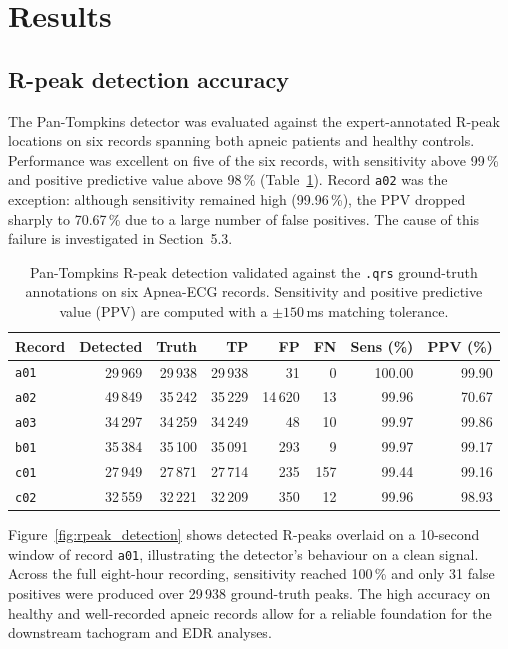 \documentclass[11pt,a4paper]{article}
\begin{document}
\section{Results}

\subsection{R-peak detection accuracy}

The Pan-Tompkins detector was evaluated against the expert-annotated R-peak locations on six records spanning both apneic patients and healthy controls. Performance was excellent on five of the six records, with sensitivity above 99\,\% and positive predictive value above 98\,\% (Table~\ref{tab:rpeak_validation}). Record \texttt{a02} was the exception: although sensitivity remained high (99.96\,\%), the PPV dropped sharply to 70.67\,\% due to a large number of false positives. The cause of this failure is investigated in Section~5.3.

\begin{table}[ht]
    \centering
    \caption{Pan-Tompkins R-peak detection validated against the \texttt{.qrs} ground-truth annotations on six Apnea-ECG records. Sensitivity and positive predictive value (PPV) are computed with a $\pm 150$\,ms matching tolerance.}
    \label{tab:rpeak_validation}
    \begin{tabular}{lrrrrrrr}
        \toprule
        Record & Detected & Truth & TP & FP & FN & Sens (\%) & PPV (\%) \\
        \midrule
        \texttt{a01} & 29\,969 & 29\,938 & 29\,938 &     31 &   0  & 100.00 & 99.90 \\
        \texttt{a02} & 49\,849 & 35\,242 & 35\,229 & 14\,620 &  13 &  99.96 & 70.67 \\
        \texttt{a03} & 34\,297 & 34\,259 & 34\,249 &     48 &  10 &  99.97 & 99.86 \\
        \texttt{b01} & 35\,384 & 35\,100 & 35\,091 &    293 &   9 &  99.97 & 99.17 \\
        \texttt{c01} & 27\,949 & 27\,871 & 27\,714 &    235 & 157 &  99.44 & 99.16 \\
        \texttt{c02} & 32\,559 & 32\,221 & 32\,209 &    350 &  12 &  99.96 & 98.93 \\
        \bottomrule
    \end{tabular}
\end{table}

Figure~\ref{fig:rpeak_detection} shows detected R-peaks overlaid on a 10-second window of record \texttt{a01}, illustrating the detector's behaviour on a clean signal. Across the full eight-hour recording, sensitivity reached 100\,\% and only 31 false positives were produced over 29\,938 ground-truth peaks. The high accuracy on healthy and well-recorded apneic records allow for a reliable foundation for the downstream tachogram and EDR analyses.
\end{document}
